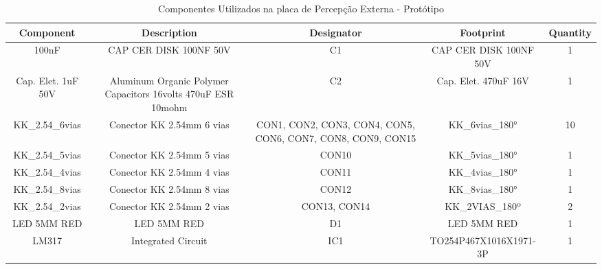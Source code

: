 \documentclass[../delivery_hospital_report.tex]{subfiles}
\begin{document}
\begin{table}[]
\caption{Componentes Utilizados na placa de Percepção Externa - Protótipo}
\centering
\begin{adjustbox}{width=\columnwidth,center}
\begin{tabular}{|c|c|c|c|c|}
\hline
Component                     & Description                                                    & Designator                                                    & Footprint                   & Quantity \\ \hline
100nF                       & CAP CER DISK 100NF   50V                                       & C1                                                            & CAP CER DISK 100NF   50V    & 1        \\ \hline
Cap. Elet. 1uF   50V        & Aluminum Organic   Polymer Capacitors 16volts 470uF ESR 10mohm & C2                                                            & Cap. Elet. 470uF 16V        & 1        \\ \hline
KK\_2.54\_6vias             & Conector KK 2.54mm 6   vias                                    & CON1, CON2, CON3,   CON4, CON5, CON6, CON7, CON8, CON9, CON15 & KK\_6vias\_180°             & 10       \\ \hline
KK\_2.54\_5vias             & Conector KK 2.54mm 5   vias                                    & CON10                                                         & KK\_5vias\_180°             & 1        \\ \hline
KK\_2.54\_4vias             & Conector KK 2.54mm 4   vias                                    & CON11                                                         & KK\_4vias\_180°             & 1        \\ \hline
KK\_2.54\_8vias             & Conector KK 2.54mm 8   vias                                    & CON12                                                         & KK\_8vias\_180°             & 1        \\ \hline
KK\_2.54\_2vias             & Conector KK 2.54mm 2   vias                                    & CON13, CON14                                                  & KK\_2VIAS\_180º             & 2        \\ \hline
LED 5MM RED                 & LED 5MM RED                                                    & D1                                                            & LED 5MM RED                 & 1        \\ \hline
LM317                       & Integrated Circuit                                             & IC1                                                           & TO254P467X1016X1971-3P      & 1        \\ \hline

\end{tabular}
\end{adjustbox}
\end{table}
\end{document}
